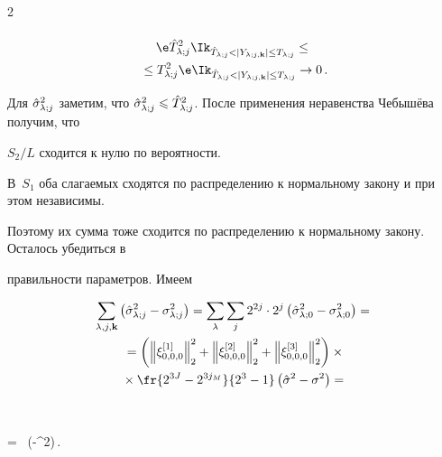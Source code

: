 \begin{multicols}{2}
\begin{multline*}
\end{multline*}





\vspace*{-12pt}





\noindent


\begin{multline*}


\e \hTlj^2 \Ik_{\hTlj<|\Yljk|\leq\Tlj} \leq{}\\


{}\leq \Tlj^2 \e\Ik_{\hTlj<|\Yljk|\leq\Tlj} \rightarrow 0\,.


\end{multline*}


Для $\hat\sigma^2_{\lambda;j}$ заметим, что $\hat\sigma^2_{\lambda;j}\leqslant\hat T_{\lambda;j}^2$. После применения неравенства Чебышёва получим, что 


$S_2/L$ сходится к нулю по вероятности.





В~$S_1$ оба слагаемых сходятся по распределению к нормальному закону и при этом независимы. 


Поэтому их сумма тоже сходится по распределению к нормальному закону. Осталось убедиться в 


правильности параметров. Имеем


\begin{multline*}


\sumljk \left(\hslj-\slj\right) = \sum\limits_\lambda \sum_j 2^{2j}\cdot 2^j \left(\hslz-\solz^2\right) = {}\\


{}= \left( \left\|\xi^{[1]}_{0,0,0}\right\|_2^2 + \left\|\xi^{[2]}_{0,0,0}\right\|_2^2 + 


\left\|\xi^{[3]}_{0,0,0}\right\|_2^2 \right)\times{}\\


{}\times \fr{2^{3J}-2^{3j_M}}{2^3-1} \left(\hsig-\sigma^2\right) = {}


\end{multline*}





\noindent


$$%


{}= \,  \left(\hsig-\sigma^2\right)\,.\hfil\square



\end{multicols}
